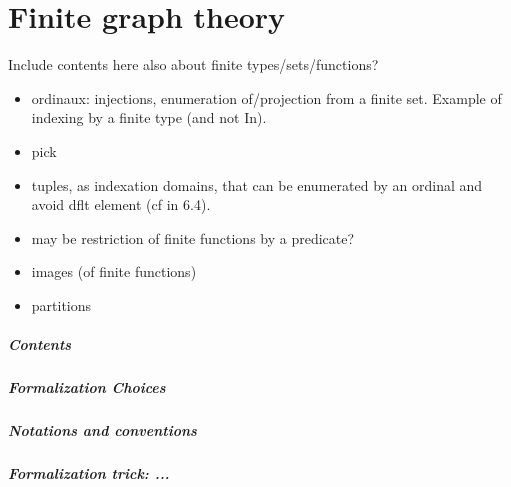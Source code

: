 \chapter{Finite graph theory}


Include contents here also about finite types/sets/functions?

\begin{itemize}
\item ordinaux: injections, enumeration of/projection from a finite
  set. Example of indexing by a finite type (and not In).
\item pick
\item tuples, as indexation domains, that can be enumerated by an
  ordinal and avoid dflt element (cf  in
  6.4).
\item may be restriction of finite functions by a predicate?
\item images (of finite functions)
\item partitions
\end{itemize}
\paragraph{Contents}

\paragraph{Formalization Choices}

\paragraph{Notations and conventions}

\paragraph{Formalization trick: ...}
